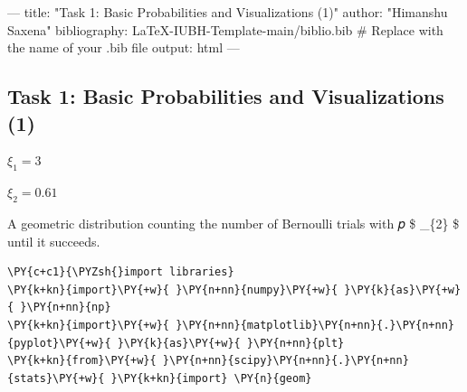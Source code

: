     \makeatletter
    \newcommand{\boxspacing}{\kern\kvtcb@left@rule\kern\kvtcb@boxsep}
    \makeatother
    \newcommand{\prompt}[4]{
        {\ttfamily\llap{{\color{#2}[#3]:\hspace{3pt}#4}}\vspace{-\baselineskip}}
    }
    

    
    \sloppy
    \hypersetup{
      breaklinks=true,  %
      colorlinks=true,
      urlcolor=urlcolor,
      linkcolor=linkcolor,
      citecolor=citecolor,
      }
    
    \geometry{verbose,tmargin=1in,bmargin=1in,lmargin=1in,rmargin=1in}
    
    


    
    \maketitle
    
    

    ---
title: "Task 1: Basic Probabilities and Visualizations (1)"
author: "Himanshu Saxena"
bibliography: LaTeX-IUBH-Template-main/biblio.bib # Replace with the name of your .bib file
output: html
---
    \subsection{Task 1: Basic Probabilities and Visualizations
(1)}\label{task-1-basic-probabilities-and-visualizations-1}

\(\xi_{1} = 3\)

\(\xi_{2} = 0.61\)

A geometric distribution counting the number of Bernoulli trials with 𝑝
\$ \xi\_\{2\} \$ until it succeeds.

    \begin{tcolorbox}[breakable, size=fbox, boxrule=1pt, pad at break*=1mm,colback=cellbackground, colframe=cellborder]
\prompt{In}{incolor}{10}{\boxspacing}
\begin{Verbatim}[commandchars=\\\{\}]
\PY{c+c1}{\PYZsh{}import libraries}
\PY{k+kn}{import}\PY{+w}{ }\PY{n+nn}{numpy}\PY{+w}{ }\PY{k}{as}\PY{+w}{ }\PY{n+nn}{np}
\PY{k+kn}{import}\PY{+w}{ }\PY{n+nn}{matplotlib}\PY{n+nn}{.}\PY{n+nn}{pyplot}\PY{+w}{ }\PY{k}{as}\PY{+w}{ }\PY{n+nn}{plt}
\PY{k+kn}{from}\PY{+w}{ }\PY{n+nn}{scipy}\PY{n+nn}{.}\PY{n+nn}{stats}\PY{+w}{ }\PY{k+kn}{import} \PY{n}{geom}
\end{Verbatim}
\end{tcolorbox}

